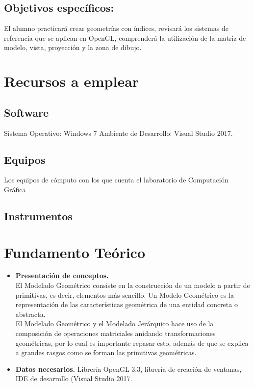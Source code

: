 \documentclass[11pt, english]{article}
\begin{document}
\subsection{Objetivos específicos:}
El alumno practicará crear geometrías con índices, revisará los sistemas de referencia que
se aplican en OpenGL, comprenderá la utilización de la matriz de modelo, vista, proyección
y la zona de dibujo.
\section{Recursos a emplear}
\subsection{Software}
Sistema Operativo: Windows 7
Ambiente de Desarrollo: Visual Studio 2017.
\subsection{Equipos}
Los equipos de cómputo con los que cuenta el laboratorio de Computación Gráfica
\subsection{Instrumentos}
\section{Fundamento Teórico}
\begin{itemize}
\item \textbf{Presentación de conceptos.} \\
El Modelado Geométrico consiste en la construcción de un modelo a partir de
primitivas, es decir, elementos más sencillo. Un Modelo Geométrico es la representación de
las características geométrica de una entidad concreta o abstracta.
\\
El Modelado Geométrico y el Modelado Jerárquico hace uso de la composición de
operaciones matriciales anidando transformaciones geométricas, por lo cual es importante repasar esto, además de que se explica a grandes rasgos como se forman las primitivas
geométricas.
\item \textbf{Datos necesarios.}
Librería OpenGL 3.3, librería de creación de ventanas, IDE de desarrollo (Visual Studio 2017.
\end{itemize}
\end{document}
